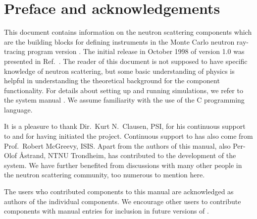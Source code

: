 
\chapter*{Preface and acknowledgements}
This document contains information on the neutron scattering components
which are the building blocks for defining instruments
in the Monte Carlo neutron
ray-tracing program \MCS version \version . The initial
release in October 1998 of version 1.0 was presented in Ref.~\cite{nn_10_20}.
The reader of this
document is not supposed to have specific knowledge of neutron scattering,
but some basic understanding of physics is helpful in
understanding the theoretical background for the component functionality.
For details about setting up and running simulations, we refer to
the \MCS system manual \cite{mcstasmanual}.
We assume familiarity with the use of
the C programming language.


It is a pleasure to thank Dir.~Kurt N.~Clausen, PSI, for his continuous
support to \MCS and for having initiated the project.
Continuous support to \MCS has also come from Prof.~Robert McGreevy, ISIS.
Apart from the authors of this manual, also Per-Olof \AA strand, NTNU Trondheim,
has contributed to the development of the \MCS system.
We have further benefited
from discussions with many other people in the neutron scattering
community, too numerous to mention here.

The users who contributed components to this manual are acknowledged
as authors of the individual components. We encourage other
users to contribute components with manual entries for inclusion in
future versions of \MCS.


